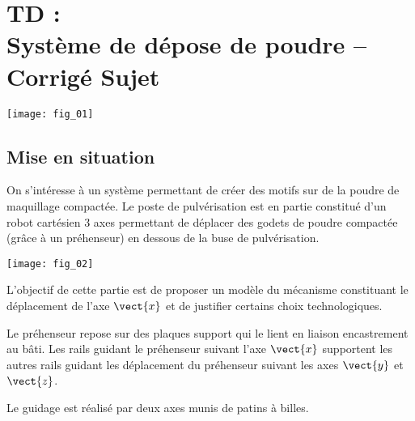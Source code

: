 \chapter*{TD  :\\ 
Système de dépose de poudre -- \ifprof Corrigé \else Sujet \fi}

\iflivret {} \else
\ifprof  {} \else \fi
\fi

\setcounter{question}{0}

\begin{marginfigure}
\texttt{[image: fig\_01]}
\end{marginfigure}


\section*{Mise en situation}
\ifprof
\else
On s'intéresse à un système permettant de créer des motifs sur de la poudre de maquillage compactée. Le poste de pulvérisation est en partie constitué d'un robot cartésien 3 axes permettant de déplacer des godets de poudre compactée (grâce à un préhenseur) en dessous de la buse de pulvérisation. 

\begin{center}
\texttt{[image: fig\_02]}
\end{center}

\fi

\begin{obj}
L’objectif de cette partie est de proposer un modèle du mécanisme constituant le déplacement de l’axe $\vect{x}$ et de justifier certains choix technologiques.
\end{obj}

\ifprof
\else
Le préhenseur repose sur des plaques support qui le lient en liaison encastrement au bâti. Les rails
guidant le préhenseur suivant l’axe $\vect{x}$ supportent les autres rails guidant les déplacement du préhenseur suivant les axes $\vect{y}$ et $\vect{z}$.

Le guidage est réalisé par deux axes munis de patins à billes.

